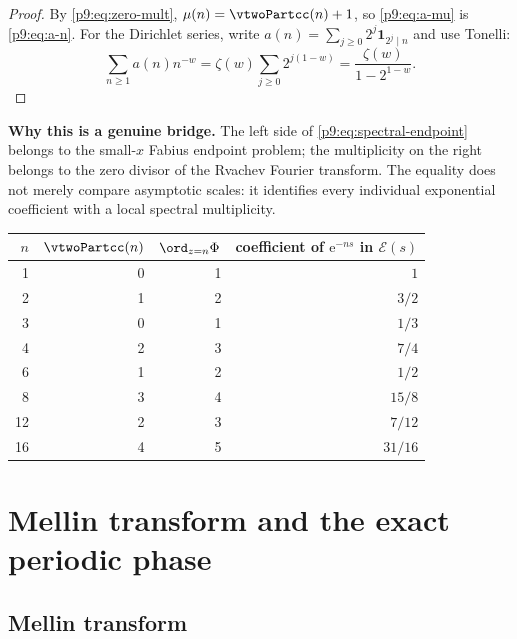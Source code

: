 \documentclass[11pt]{article}
\numberwithin{equation}{section}
\theoremstyle{definition}
\theoremstyle{remark}
\newcommand{\e}{\mathrm e}
\begin{document}
\begin{proof}
By \eqref{p9:eq:zero-mult}, $\mu(n)=\vtwoPartcc(n)+1$, so \eqref{p9:eq:a-mu} is
\eqref{p9:eq:a-n}.  For the Dirichlet series, write
$a(n)=\sum_{j\ge0}2^j\mathbf1_{2^j\mid n}$ and use Tonelli:
\[
 \sum_{n\ge1}a(n)n^{-w}
 =\zeta(w)\sum_{j\ge0}2^{j(1-w)}
 =\frac{\zeta(w)}{1-2^{1-w}}.
\]
\end{proof}

\begin{boxedremark}
\textbf{Why this is a genuine bridge.}
The left side of \eqref{p9:eq:spectral-endpoint} belongs to the small-$x$ Fabius endpoint
problem; the multiplicity on the right belongs to the zero divisor of the Rvachev Fourier
transform.  The equality does not merely compare asymptotic scales: it identifies every
individual exponential coefficient with a local spectral multiplicity.
\end{boxedremark}

\begin{center}
\begin{tabular}{@{}rrrr@{}}
\toprule
$n$ & $\vtwoPartcc(n)$ & $\ord_{z=n}\Phi$ & coefficient of $\e^{-ns}$ in $\mathcal E(s)$\\
\midrule
1 & 0 & 1 & $1$\\
2 & 1 & 2 & $3/2$\\
3 & 0 & 1 & $1/3$\\
4 & 2 & 3 & $7/4$\\
6 & 1 & 2 & $1/2$\\
8 & 3 & 4 & $15/8$\\
12 & 2 & 3 & $7/12$\\
16 & 4 & 5 & $31/16$\\
\bottomrule
\end{tabular}
\end{center}

\section{Mellin transform and the exact periodic phase}
\label{p9:sec:Mellin}

\subsection{Mellin transform}
\end{document}
